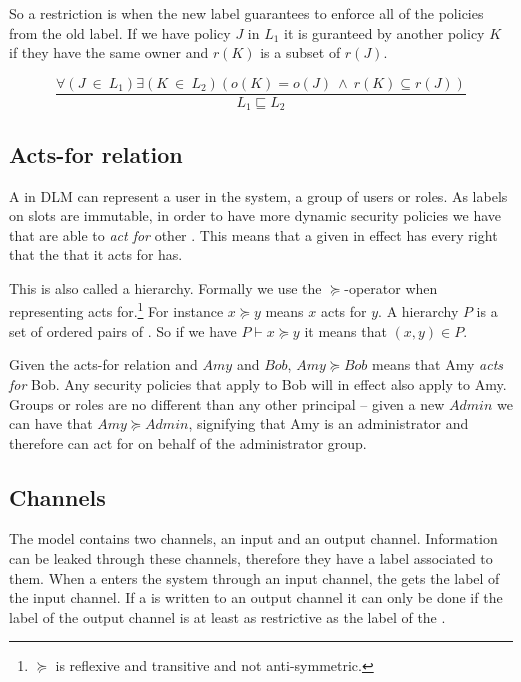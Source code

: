 So a restriction is when the new label guarantees to enforce all of the policies from the old label.
If we have policy $J$ in $L_1$ it is guranteed by another policy $K$ if they have the same owner and $r(K)$ is a subset of $r(J)$.
\begin{definition}
$$\frac{\forall (J \ \in \ L_1) \exists (K \ \in \ L_2)(o(K) = o(J) \ \wedge \ r(K) \subseteq r(J))}{L_1 \sqsubseteq L_2}$$
\end{definition}

\subsection{Acts-for relation}
A \principal{} in DLM can represent a user in the system, a group of users or roles.
As labels on slots are immutable, in order to have more dynamic security policies we have that \principals{} are able to \textit{act for} other \principals{}.
This means that a given \principal{} in effect has every right that the \principal{} that it acts for has.

This is also called a \principal{} hierarchy.
Formally we use the $\succeq$-operator when representing acts for.\footnote{$\succeq$ is reflexive and transitive and not anti-symmetric.}
For instance $x \succeq y$ means $x$ acts for $y$.
A \principal{} hierarchy $P$ is a set of ordered pairs of \principals{}.
So if we have $P \vdash x \succeq y$ it means that $(x,y) \in P$.

Given the acts-for relation and \principals{} $Amy$ and $Bob$, $Amy \succeq Bob$ means that Amy \textit{acts for} Bob.
Any security policies that apply to Bob will in effect also apply to Amy.
Groups or roles are no different than any other principal -- given a new \principal{} $Admin$ we can have that $Amy \succeq Admin$, signifying that Amy is an administrator and therefore can act for on behalf of the administrator group.
\subsection{Channels}
The model contains two channels, an input and an output channel.
Information can be leaked through these channels, therefore they have a label associated to them.
When a \xvalue{} enters the system through an input channel, the \xvalue{} gets the label of the input channel.
If a \xvalue{} is written to an output channel it can only be done if the label of the output channel is at least as restrictive as the label of the \xvalue{}.
